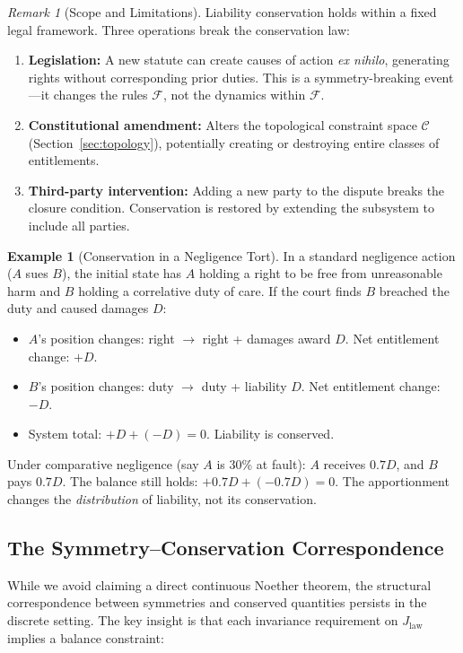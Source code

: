 \documentclass[12pt]{article}
\theoremstyle{definition}
\newtheorem{example}[theorem]{Example}
\theoremstyle{remark}
\newtheorem{remark}[theorem]{Remark}
\newcommand{\C}{\mathcal{C}}               %
\begin{document}
\begin{remark}[Scope and Limitations]
Liability conservation holds within a fixed legal framework.  Three operations break the conservation law:
\begin{enumerate}
    \item \textbf{Legislation:} A new statute can create causes of action \emph{ex nihilo}, generating rights without corresponding prior duties.  This is a symmetry-breaking event---it changes the rules $\mathcal{F}$, not the dynamics within $\mathcal{F}$.
    \item \textbf{Constitutional amendment:} Alters the topological constraint space $\C$ (Section~\ref{sec:topology}), potentially creating or destroying entire classes of entitlements.
    \item \textbf{Third-party intervention:} Adding a new party to the dispute breaks the closure condition.  Conservation is restored by extending the subsystem to include all parties.
\end{enumerate}
\end{remark}

\begin{example}[Conservation in a Negligence Tort]
\label{ex:tort_conservation}
In a standard negligence action ($A$ sues $B$), the initial state has $A$ holding a right to be free from unreasonable harm and $B$ holding a correlative duty of care.  If the court finds $B$ breached the duty and caused damages $D$:
\begin{itemize}
    \item $A$'s position changes: right $\to$ right + damages award $D$.  Net entitlement change: $+D$.
    \item $B$'s position changes: duty $\to$ duty + liability $D$.  Net entitlement change: $-D$.
    \item System total: $+D + (-D) = 0$.  Liability is conserved.
\end{itemize}
Under comparative negligence (say $A$ is 30\% at fault): $A$ receives $0.7D$, and $B$ pays $0.7D$.  The balance still holds: $+0.7D + (-0.7D) = 0$.  The apportionment changes the \emph{distribution} of liability, not its conservation.
\end{example}

\subsection{The Symmetry--Conservation Correspondence}

While we avoid claiming a direct continuous Noether theorem, the structural correspondence between symmetries and conserved quantities persists in the discrete setting.  The key insight is that each invariance requirement on $J_{\text{law}}$ implies a balance constraint:
\end{document}
